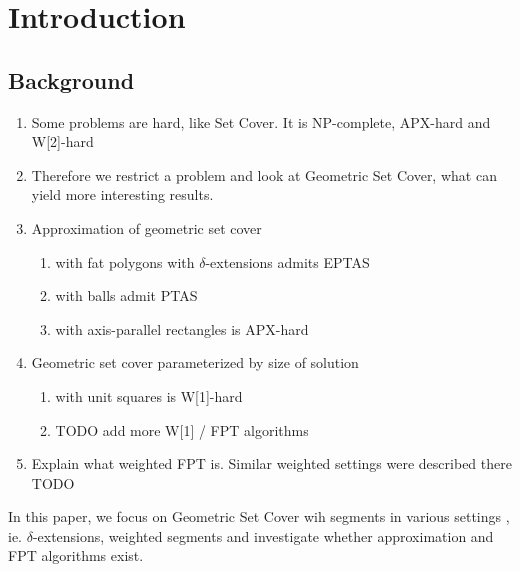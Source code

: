\chapter{Introduction}

\section{Background}
\begin{enumerate}
\item Some problems are hard, like Set Cover. It is NP-complete,
APX-hard and W[2]-hard \cite{platypus_book}
\item Therefore we restrict a problem and look at Geometric Set Cover,
      what can yield more interesting results.
\item Approximation of geometric set cover
	\begin{enumerate}
		\item with fat polygons with $\delta$-extensions admits EPTAS \cite{harpeled12}
		\item with balls admit PTAS \cite{settling_apx_hardness}
		\item with axis-parallel rectangles is APX-hard \cite{settling_apx_hardness}
	\end{enumerate}
\item Geometric set cover parameterized by size of solution
	\begin{enumerate}
		\item with unit squares is W[1]-hard \cite{marx05}
		\item TODO add more W[1] / FPT algorithms
	\end{enumerate}
\item Explain what weighted FPT is. Similar weighted settings
were described there TODO
\end{enumerate}

In this paper, we focus on Geometric Set Cover wih segments
in various settings , ie. $\delta$-extensions, weighted segments
and investigate whether approximation and FPT algorithms exist.


